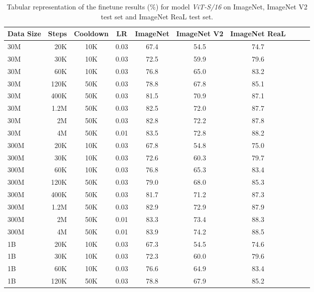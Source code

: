\begin{table}[h]
  \setlength{\tabcolsep}{5pt}
  \setlength{\extrarowheight}{5pt}
  \renewcommand{\arraystretch}{0.75}
  \centering
  \caption{Tabular representation of the finetune results (\%) for model \emph{ViT-S/16} on ImageNet, ImageNet V2 test set and ImageNet ReaL test set.}\label{tbl:s_16_ft}
  \begin{tabulary}{1.0\textwidth}{l r c c c c c c c c}
    \toprule[1pt]
    \bf{Data Size} & \bf{Steps} & \bf{Cooldown} & \bf{LR} & \bf{ImageNet} & \bf{ImageNet V2} & \bf{ImageNet ReaL} \\
    \midrule
30M   & 20K   & 10K   & 0.03 & 67.4 & 54.5 & 74.7 \\
30M   & 30K   & 10K   & 0.03 & 72.5 & 59.9 & 79.6 \\
30M   & 60K   & 10K   & 0.03 & 76.8 & 65.0 & 83.2 \\
30M   & 120K  & 50K   & 0.03 & 78.8 & 67.8 & 85.1 \\
30M   & 400K  & 50K   & 0.03 & 81.5 & 70.9 & 87.1 \\
30M   & 1.2M  & 50K   & 0.03 & 82.5 & 72.0 & 87.7 \\
30M   & 2M    & 50K   & 0.03 & 82.8 & 72.2 & 87.8 \\
30M   & 4M    & 50K   & 0.01 & 83.5 & 72.8 & 88.2 \\
\midrule[0.25pt]
300M  & 20K   & 10K   & 0.03 & 67.8 & 54.8 & 75.0 \\
300M  & 30K   & 10K   & 0.03 & 72.6 & 60.3 & 79.7 \\
300M  & 60K   & 10K   & 0.03 & 76.8 & 65.3 & 83.4 \\
300M  & 120K  & 50K   & 0.03 & 79.0 & 68.0 & 85.3 \\
300M  & 400K  & 50K   & 0.03 & 81.7 & 71.2 & 87.3 \\
300M  & 1.2M  & 50K   & 0.03 & 82.9 & 72.9 & 87.9 \\
300M  & 2M    & 50K   & 0.01 & 83.3 & 73.4 & 88.3 \\
300M  & 4M    & 50K   & 0.01 & 83.9 & 74.2 & 88.5 \\
\midrule[0.25pt]
1B    & 20K   & 10K   & 0.03 & 67.3 & 54.5 & 74.6 \\
1B    & 30K   & 10K   & 0.03 & 72.3 & 60.0 & 79.6 \\
1B    & 60K   & 10K   & 0.03 & 76.6 & 64.9 & 83.4 \\
1B    & 120K  & 50K   & 0.03 & 78.8 & 67.9 & 85.2 \\

\end{tabulary}
\end{table}
